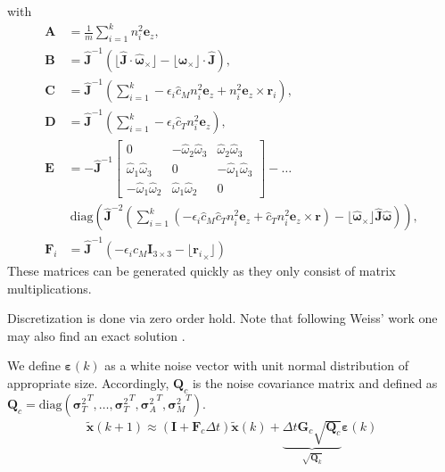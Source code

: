 \documentclass[10pt,a4paper]{article}
\newcommand{\skewsym}[1]{\lfloor #1 _\times \rfloor}
\newcommand{\angvel}{\boldsymbol{\omega}}
\newcommand{\kthrh}{\hat{c}_T}
\newcommand{\kmomh}{\hat{c}_M}
\newcommand{\Inertia}{\mathbf{J}}
\begin{document}
with
\begin{align}
\mathbf{A} &= \frac{1}{m} \sum_{i=1}^k n_i^2 \mathbf{e}_z , \label{eq:A}\\
\mathbf{B} &= \hat{\mathbf{J}}^{-1} \left( \skewsym{\hat{\Inertia} \cdot \hat{\angvel}} - \skewsym{\angvel} \cdot \hat{\Inertia} \right) ,\label{eq:B}\\
\mathbf{C} &= \hat{\Inertia}^{-1} \left( \sum_{i=1}^k -\epsilon_i \kmomh n_i^2 \mathbf{e}_z + n_i^2 \mathbf{e}_z \times \mathbf{r}_i \right) ,\label{eq:C}\\
\mathbf{D} &= \hat{\Inertia}^{-1} \left( \sum_{i=1}^k -\epsilon_i \kthrh n_i^2 \mathbf{e}_z  \right) ,\label{eq:D}\\
\mathbf{E} &= - \hat{\Inertia}^{-1} \begin{bmatrix}
0 & -\hat{\omega}_2\hat{\omega}_3 & \hat{\omega}_2\hat{\omega}_3 \\
\hat{\omega}_1\hat{\omega}_3 & 0 & -\hat{\omega}_1\hat{\omega}_3 \\
-\hat{\omega}_1\hat{\omega}_2 & \hat{\omega}_1\hat{\omega}_2 & 0
\end{bmatrix} - \ldots \\
&~ \mathrm{diag} \left( \hat{\Inertia}^{-2} \left( \sum_{i=1}^k \left( -\epsilon_i \kmomh \kthrh n_i^2 \mathbf{e}_z + \kthrh n_i^2 \mathbf{e}_z \times \mathbf{r} \right) - \skewsym{\hat{\angvel}} \hat{\Inertia} \hat{\angvel} \right) \right), \label{eq:E}\\
\mathbf{F}_i &= \hat{\Inertia}^{-1} \left( -\epsilon_i \kmomh \mathbf{I}_{3\times3} - \skewsym{{\mathbf{r}_i}} \right) 
\end{align}
These matrices can be generated quickly as they only consist of matrix multiplications.

Discretization is done via zero order hold. Note that following Weiss' work one may also find an exact solution \cite{weiss2012vision}. 

We define $\boldsymbol{\varepsilon}(k)$ as a white noise vector with unit normal distribution of appropriate size. Accordingly, $\mathbf{Q}_c$ is the noise covariance matrix and defined as $\mathbf{Q}_c = \mathrm{diag} ( {\boldsymbol{\sigma}_T^2}^T, \ldots , {\boldsymbol{\sigma}_T^2}^T, {\boldsymbol{\sigma}_A^2}^T, {\boldsymbol{\sigma}_M^2}^T  )$.
\begin{align}
\tilde{\mathbf{x}} (k+1) \approx (\mathbf{I} + \mathbf{F}_c \Delta t) \tilde{\mathbf{x}}(k) + \underbrace{\Delta t \mathbf{G}_c  \sqrt{\mathbf{Q}_c}}_{\sqrt{\mathbf{Q}_k}} \boldsymbol{\varepsilon}(k)
\end{align}
\end{document}
